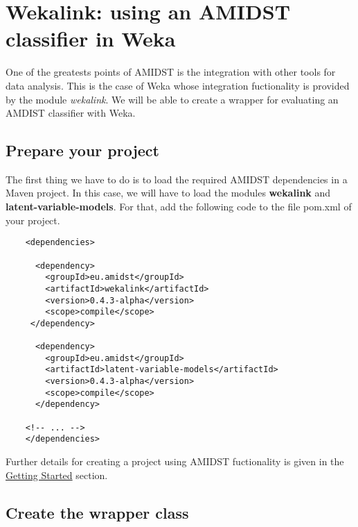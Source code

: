 \documentclass[10pt,a4paper]{article}
\begin{document}
\section{Wekalink: using an AMIDST classifier in Weka}\label{requirements-amidst-toolbox}

 
One of the greatests points of AMIDST is the integration with other tools for data analysis. This is the case of Weka whose integration fuctionality is provided by the module \textit{wekalink}. We will be able to create a wrapper for evaluating an AMDIST classifier with Weka.



\subsection{Prepare your project}

The first thing we have to do is to load the required AMIDST dependencies in a Maven project. In this case, we will have to load the modules \textbf{wekalink} and \textbf{latent-variable-models}. For that, add the following code to the file pom.xml of your project.

\begin{verbatim}
    <dependencies>
    
      <dependency>
        <groupId>eu.amidst</groupId>
        <artifactId>wekalink</artifactId>
        <version>0.4.3-alpha</version>
        <scope>compile</scope>
     </dependency>
     
      <dependency>
        <groupId>eu.amidst</groupId>
        <artifactId>latent-variable-models</artifactId>
        <version>0.4.3-alpha</version>
        <scope>compile</scope>
      </dependency>
    
    <!-- ... -->
    </dependencies>
\end{verbatim}


Further details for creating a project using AMIDST fuctionality is given in the \href{../GettingStarted/}{Getting Started} section.

\subsection{Create the wrapper class}
\end{document}
